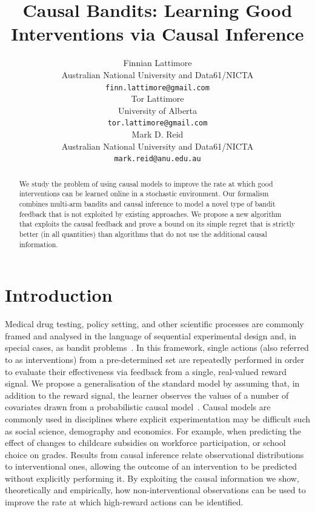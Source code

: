 \documentclass{article}
\title{Causal Bandits: Learning Good Interventions via Causal Inference}
\author{
  Finnian Lattimore \\
  Australian National University and Data61/NICTA \\
  \texttt{finn.lattimore@gmail.com} \\
   \And
   Tor Lattimore \\
   University of Alberta \\
   \texttt{tor.lattimore@gmail.com} \\
   \And
   Mark D. Reid \\
   Australian National University and Data61/NICTA \\
   \texttt{mark.reid@anu.edu.au} \\
}
\theoremstyle{plain}
\theoremstyle{definition}
\begin{document}
\maketitle

\begin{abstract} 
We study the problem of using causal models to improve the rate at which good interventions can be learned online in a stochastic environment. 
Our formalism combines multi-arm bandits and causal inference to model a novel type of bandit feedback that is not exploited by existing approaches.
We propose a new algorithm that exploits the causal feedback and prove a bound on its simple regret that is strictly better (in all quantities) 
than algorithms that do not use the additional causal information.
\end{abstract} 





\section{Introduction}
\label{sec:intro}
Medical drug testing, policy setting, and other scientific processes are commonly framed and analysed in the language of sequential experimental design and, in special cases, as bandit problems~\citep{Robbins1952,Chernoff1959}. 
In this framework, single actions (also referred to as interventions) from a pre-determined set are repeatedly performed in 
order to evaluate their effectiveness via feedback from a single, real-valued reward signal.
We propose a generalisation of the standard model by assuming that, in addition to the reward signal, the learner observes the values of a number of covariates 
drawn from a probabilistic causal model~\citep{Pearl2000}.
Causal models are commonly used in disciplines where explicit experimentation may be difficult such as social science, demography and economics.
For example, when predicting the effect of changes to childcare subsidies on workforce participation, or school choice on grades. 
Results from causal inference relate observational distributions to interventional ones, allowing the outcome of an intervention to be predicted without
explicitly performing it.
By exploiting the causal information we show, theoretically and empirically, how non-interventional observations can be used to improve the rate at 
which high-reward actions can be identified.
\end{document}
